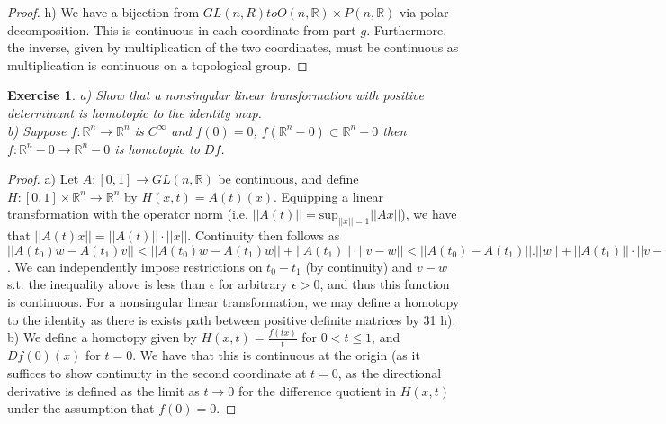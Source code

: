 \documentclass{article}
\newtheorem{exercise}{Exercise}
\begin{document}
\begin{proof}
h) We have a bijection from $GL(n, R) to O(n, \mathbb{R}) \times P(n, \mathbb{R})$ via polar decomposition. This is continuous in each coordinate from part $g$. Furthermore, the inverse, given by multiplication of the two coordinates, must be continuous as multiplication is continuous on a topological group.
\end{proof}

\begin{exercise}
  a) Show that a nonsingular linear transformation with positive determinant is homotopic to the identity map. \\
  b) Suppose $f:\mathbb{R}^{n}\to \mathbb{R}^{n}$ is $C^{\infty}$ and $f(0)=0$, $f(\mathbb{R}^{n}-0) \subset \mathbb{R}^{n}-0$ then $f: \mathbb{R}^{n}-0 \to \mathbb{R}^{n}-0$ is homotopic to $Df$. 
\end{exercise}
\begin{proof}
  a) Let $A:[0,1] \to GL(n,\mathbb{R})$ be continuous, and define $H:[0,1]\times \mathbb{R}^{n} \to \mathbb{R}^{n}$ by $H(x,t) = A(t)(x)$. Equipping a linear transformation with the operator norm (i.e. $||A(t)|| = \text{sup}_{||x||=1}||Ax||$), we have that $||A(t)x|| = ||A(t)||\cdot||x||$. Continuity then follows as $||A(t_{0})w - A(t_{1})v|| < ||A(t_{0})w - A(t_{1})w|| + ||A(t_{1})||\cdot||v-w|| < ||A(t_{0}) - A(t_{1})||.||w|| + ||A(t_{1})||\cdot ||v-w||$. We can independently impose restrictions on $t_{0}-t_{1}$ (by continuity) and $v-w$ s.t. the inequality above is less than $\epsilon$ for arbitrary $\epsilon > 0$, and thus this function is continuous. For a nonsingular linear transformation, we may define a homotopy to the identity as there is exists path between positive definite matrices by 31 h). \\

  b) We define a homotopy given by $H(x,t) = \frac{f(tx)}{t}$ for $0<t\leq 1$, and $Df(0)(x)$ for $t = 0$. We have that this is continuous at the origin (as it suffices to show continuity in the second coordinate at $t=0$, as the directional derivative is defined as the limit as $t \to 0$ for the difference quotient in $H(x,t)$ under the assumption that $f(0) = 0$.  
\end{proof}
\end{document}
